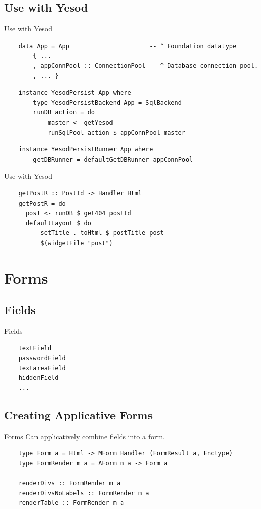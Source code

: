 \documentclass[pdf]{beamer}
\begin{document}
\subsection{Use with Yesod}
\begin{frame}[fragile]{Use with Yesod}
  \begin{verbatim}
    data App = App                      -- ^ Foundation datatype
        { ...
        , appConnPool :: ConnectionPool -- ^ Database connection pool.
        , ... }
  \end{verbatim}
  \begin{verbatim}
    instance YesodPersist App where
        type YesodPersistBackend App = SqlBackend
        runDB action = do
            master <- getYesod
            runSqlPool action $ appConnPool master
  \end{verbatim}
  \begin{verbatim}
    instance YesodPersistRunner App where
        getDBRunner = defaultGetDBRunner appConnPool
  \end{verbatim}
\end{frame}

\begin{frame}[fragile]{Use with Yesod}
  \begin{verbatim}
    getPostR :: PostId -> Handler Html
    getPostR = do
      post <- runDB $ get404 postId
      defaultLayout $ do
          setTitle . toHtml $ postTitle post
          $(widgetFile "post")
  \end{verbatim}
\end{frame}

\section{Forms}
\subsection{Fields}
\begin{frame}[fragile]{Fields}
  \begin{verbatim}
    textField
    passwordField
    textareaField
    hiddenField
    ...
  \end{verbatim}
\end{frame}

\subsection{Creating Applicative Forms}
\begin{frame}[fragile]{Forms}
  Can applicatively combine fields into a form.
  \begin{verbatim}
    type Form a = Html -> MForm Handler (FormResult a, Enctype)
    type FormRender m a = AForm m a -> Form a

    renderDivs :: FormRender m a
    renderDivsNoLabels :: FormRender m a
    renderTable :: FormRender m a
  \end{verbatim}
\end{frame}
\end{document}
